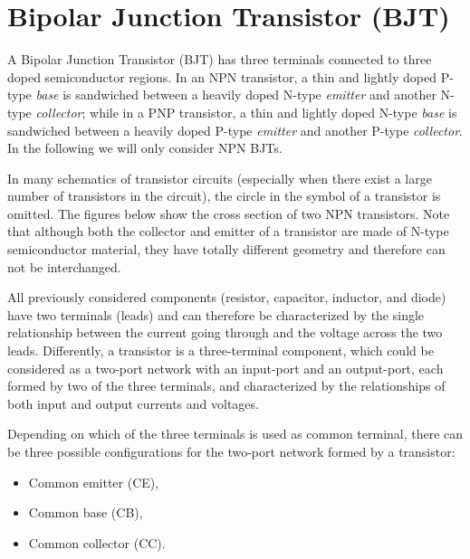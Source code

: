\documentclass{article}
\begin{document}
\section*{Bipolar Junction Transistor (BJT)} 

A Bipolar Junction Transistor (BJT) has three terminals connected to three
doped semiconductor regions. In an NPN transistor, a thin and lightly doped 
P-type {\em base} is sandwiched between a heavily doped N-type {\em emitter}
and another N-type {\em collector}; while in a PNP transistor, a thin and 
lightly doped N-type {\em base} is sandwiched between a heavily doped P-type
{\em emitter} and another P-type {\em collector}. In the following we will 
only consider NPN BJTs.



In many schematics of transistor circuits (especially when there exist a
large number of transistors in the circuit), the circle in the symbol of
a transistor is omitted. The figures below show the cross section of two
NPN transistors. Note that although both the collector and emitter of a
transistor are made of N-type semiconductor material, they have totally
different geometry and therefore can not be interchanged.



All previously considered components (resistor, capacitor, inductor, and 
diode) have two terminals (leads) and can therefore be characterized by 
the single relationship between the current going through and the voltage 
across the two leads. Differently, a transistor is a three-terminal component,
which could be considered as a two-port network with an input-port and an
output-port, each formed by two of the three terminals, and characterized
by the relationships of both input and output currents and voltages.

Depending on which of the three terminals is used as common terminal, there
can be three possible configurations for the two-port network formed by a
transistor: 
\begin{itemize}
\item Common emitter (CE), 
\item Common base (CB), 
\item Common collector (CC).
\end{itemize}
\end{document}
